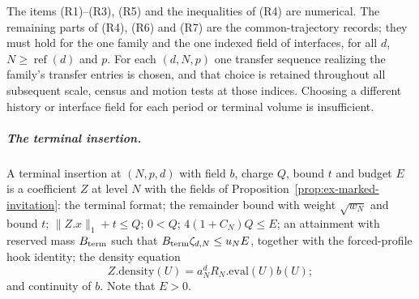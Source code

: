 The items (R1)--(R3), (R5) and the inequalities of (R4) are numerical.
The remaining parts of (R4), (R6) and (R7) are the common-trajectory records;
they must hold for the one family and the one indexed field of interfaces,
for all $d$, $N\geq\operatorname{ref}(d)$ and $p$. For each $(d,N,p)$
one transfer sequence realizing the family's transfer entries is chosen, and that
choice is retained throughout all subsequent scale, census and motion
tests at those indices. Choosing a different history or interface field for
each period or terminal volume is insufficient.

\subparagraph{The terminal insertion.}
A terminal insertion at $(N,p,d)$ with field $b$, charge $Q$, bound $t$ and
budget $E$ is a coefficient $Z$ at level $N$ with the fields of
Proposition~\ref{prop:ex-marked-invitation}: the terminal format; the
remainder bound with weight $\sqrt{w_N}$ and bound $t$;
$\|Z.x\|_1+t\leq Q$; $0<Q$; $4(1+C_N)Q\leq E$; an attainment with reserved
mass $B_{\rm term}$ such that $B_{\rm term}\zeta_{d,N}\leq u_NE$,
together with the forced-profile hook identity; the density equation
\[
 Z.\mathrm{density}(U)=a_N^d R_N.\mathrm{eval}(U)b(U);
\]
and continuity of $b$. Note that $E>0$.

